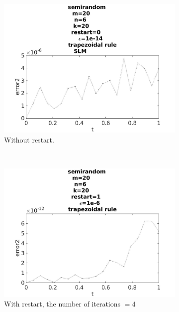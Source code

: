 \begin{figure}[H]
        \begin{subfigure}[b]{0.3\textwidth}
                \includegraphics[width=\textwidth]{../MATLAB/fig/errortestrestart02.jpg}
                \caption{ Without restart. }
                \label{fig:errortestrestart02}
        \end{subfigure}
        ~
        \begin{subfigure}[b]{0.3\textwidth}
                \includegraphics[width=\textwidth]{../MATLAB/fig/errortestrestart22.jpg}
                \caption{ With restart, the number of iterations $= 4$ }
                \label{fig:errortestrestart22}
        \end{subfigure}
        ~
		\begin{subfigure}[b]{0.3\textwidth}

\end{subfigure}
\end{figure}

